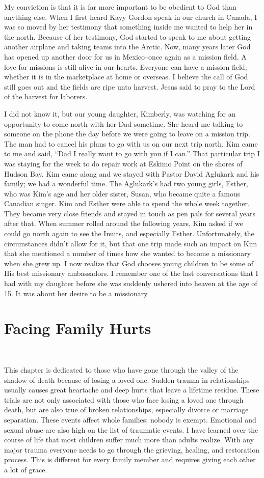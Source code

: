 \documentclass[oneside]{book}
\begin{document}
My conviction is that it is far more important to be obedient to God than anything else. When I first heard Kayy Gordon speak in our church in Canada, I was so moved by her testimony that something inside me wanted to help her in the north. Because of her testimony, God started to speak to me about getting another airplane and taking teams into the Arctic. Now, many years later God has opened up another door for us in Mexico--once again as a mission field. A love for missions is still alive in our hearts. Everyone can have a mission field; whether it is in the marketplace at home or overseas. I believe the call of God still goes out and the fields are ripe unto harvest. Jesus said to pray to the Lord of the harvest for laborers.

I did not know it, but our young daughter, Kimberly, was watching for an opportunity to come north with her Dad sometime. She heard me talking to someone on the phone the day before we were going to leave on a mission trip. The man had to cancel his plans to go with us on our next trip north. Kim came to me and said, “Dad I really want to go with you if I can.” That particular trip I was staying for the week to do repair work at Eskimo Point on the shores of Hudson Bay. Kim came along and we stayed with Pastor David Aglukark and his family; we had a wonderful time. The Aglukark’s had two young girls, Esther, who was Kim's age and her older sister, Susan, who became quite a famous Canadian singer. Kim and Esther were able to spend the whole week together. They became very close friends and stayed in touch as pen pals for several years after that. When summer rolled around the following years, Kim asked if we could go north again to see the Inuits, and especially Esther. Unfortunately, the circumstances didn’t allow for it, but that one trip made such an impact on Kim that she mentioned a number of times how she wanted to become a missionary when she grew up. I now realize that God chooses young children to be some of His best missionary ambassadors. I remember one of the last conversations that I had with my daughter before she was suddenly ushered into heaven at the age of 15. It was about her desire to be a missionary.


\chapter{Facing Family Hurts}
\

This chapter is dedicated to those who have gone through the valley of the shadow of death because of losing a loved one. Sudden trauma in relationships usually causes great heartache and deep hurts that leave a lifetime residue. These trials are not only associated with those who face losing a loved one through death, but are also true of broken relationships, especially divorce or marriage separation. These events affect whole families; nobody is exempt. Emotional and sexual abuse are also high on the list of traumatic events. I have learned over the course of life that most children suffer much more than adults realize. With any major trauma everyone needs to go through the grieving, healing, and restoration process. This is different for every family member and requires giving each other a lot of grace.
\end{document}
